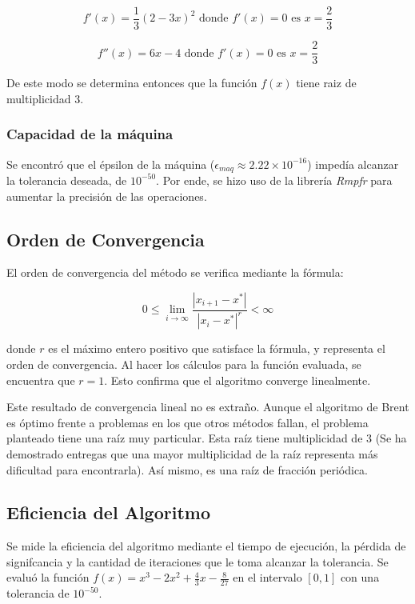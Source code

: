 \documentclass[a4paper,12pt]{article}
\begin{document}
\[ f'(x)=\frac{1}{3}(2-3x)^2 \textrm{ donde } f'(x)=0 \textrm{ es } x = \frac{2}{3} \]

\[ f''(x)=6x-4 \textrm{ donde } f'(x)=0 \textrm{ es } x = \frac{2}{3} \]

De este modo se determina entonces que la función $f(x)$ tiene raiz de multiplicidad 3. \par

\subsubsection{Capacidad de la máquina}

Se encontró que el épsilon de la máquina ($\epsilon_{maq} \approx 2.22 \times 10^{-16}$) impedía alcanzar la tolerancia deseada, de $10^{-50}$. Por ende, se hizo uso de la librería \emph{Rmpfr} para aumentar la precisión de las operaciones. \par 

\newpage 

\subsection{Orden de Convergencia}

El orden de convergencia del método se verifica mediante la fórmula: \par

\[ 0 \leq \lim_{i\to\infty} \frac{|x_{i+1}-x^*|}{|x_i-x^*|^r} < \infty \]

donde $r$ es el máximo entero positivo que satisface la fórmula, y representa el orden de convergencia. Al hacer los cálculos para la función evaluada, se encuentra que $r=1$. Esto confirma que el algoritmo converge linealmente. \par

Este resultado de convergencia lineal no es extraño. Aunque el algoritmo de Brent es óptimo frente a problemas en los que otros métodos fallan, el problema planteado tiene una raíz muy particular. Esta raíz tiene multiplicidad de 3 (Se ha demostrado entregas que una mayor multiplicidad de la raíz representa más dificultad para encontrarla). Así mismo, es una raíz de fracción periódica. \par

\subsection{Eficiencia del Algoritmo} 

Se mide la eficiencia del algoritmo mediante el tiempo de ejecución, la pérdida de signifcancia y la cantidad de iteraciones que le toma alcanzar la tolerancia. Se evaluó la función $f(x)=x^3-2x^2+\frac{4}{3}x-\frac{8}{27}$ en el intervalo $[0,1]$ con una tolerancia de $10^{-50}$. \par 
\end{document}
